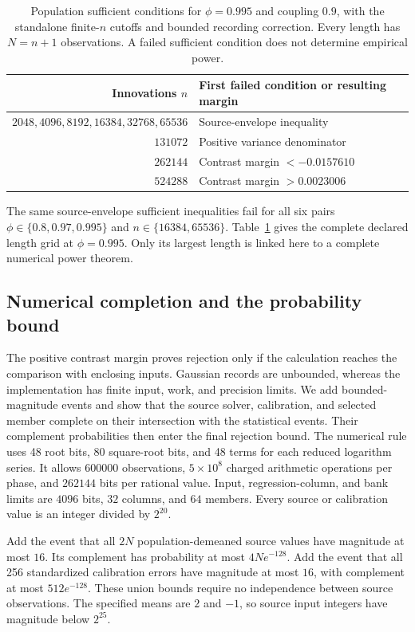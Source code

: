 \begin{table}[t]
\centering\small
\caption{Population sufficient conditions for $\phi=0.995$ and coupling $0.9$, with the standalone finite-$n$ cutoffs and bounded recording correction. Every length has $N=n+1$ observations. A failed sufficient condition does not determine empirical power.}\label{src16:si-markers}
\begin{tabular}{@{}rl@{}}\toprule
Innovations $n$ & First failed condition or resulting margin\\\midrule
$2048,4096,8192,16384,32768,65536$ & Source-envelope inequality\\
$131072$ & Positive variance denominator\\
$262144$ & Contrast margin $<-0.0157610$\\
$524288$ & Contrast margin $>0.0023006$\\\bottomrule
\end{tabular}
\end{table}
The same source-envelope sufficient inequalities fail for all six pairs $\phi\in\{0.8,0.97,0.995\}$ and $n\in\{16384,65536\}$. Table~\ref{src16:si-markers} gives the complete declared length grid at $\phi=0.995$. Only its largest length is linked here to a complete numerical power theorem.

\subsection{Numerical completion and the probability bound}\label{src16:si-completion}
The positive contrast margin proves rejection only if the calculation reaches the comparison with enclosing inputs. Gaussian records are unbounded, whereas the implementation has finite input, work, and precision limits. We add bounded-magnitude events and show that the source solver, calibration, and selected member complete on their intersection with the statistical events. Their complement probabilities then enter the final rejection bound.
The numerical rule uses 48 root bits, 80 square-root bits, and 48 terms for each reduced logarithm series. It allows $600000$ observations, $5\times10^8$ charged arithmetic operations per phase, and $262144$ bits per rational value. Input, regression-column, and bank limits are $4096$ bits, $32$ columns, and $64$ members. Every source or calibration value is an integer divided by $2^{20}$.

Add the event that all $2N$ population-demeaned source values have magnitude at most $16$. Its complement has probability at most $4Ne^{-128}$. Add the event that all 256 standardized calibration errors have magnitude at most $16$, with complement at most $512e^{-128}$. These union bounds require no independence between source observations. The specified means are $2$ and $-1$, so source input integers have magnitude below $2^{25}$.

